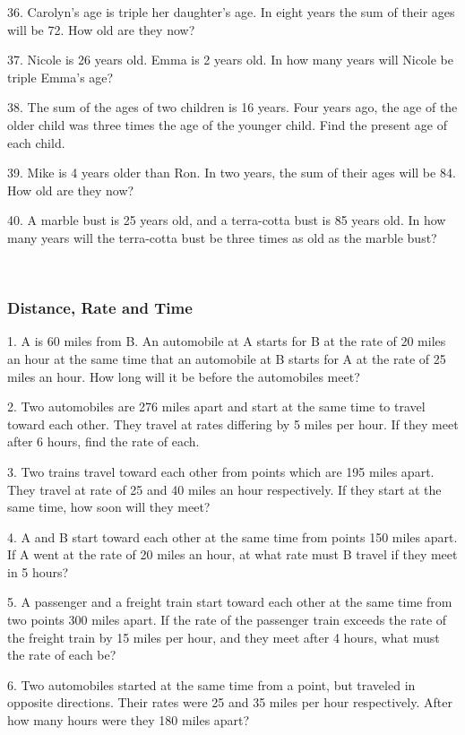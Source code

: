 36. Carolyn's age is triple her daughter's age. In eight years the sum of
their ages will be 72. How old are they now?

37. Nicole is 26 years old. Emma is 2 years old. In how many years will Nicole
be triple Emma's age?

38. The sum of the ages of two children is 16 years. Four years ago, the age
of the older child was three times the age of the younger child.
Find the present age of each child.

39. Mike is 4 years older than Ron. In two years, the sum of their ages will
be 84. How old are they now?

40. A marble bust is 25 years old, and a terra-cotta bust is 85 years old. In
how many years will the terra-cotta bust be three times as old
as the marble bust?

\vspace{4in}
~


\pagebreak

	\subsubsection{Distance, Rate and Time}\par

1. A is 60 miles from B. An automobile at A starts for B at the rate of 20
miles an hour at the same time that an automobile at B starts
for A at the rate of 25 miles an hour. How long will it be
before the automobiles meet?

2. Two automobiles are 276 miles apart and start at the same time to travel toward each other. They travel at rates differing by 5
miles per hour. If they meet after 6 hours, find the rate of
each.

3. Two trains travel toward each other from points which are 195 miles apart.
They travel at rate of 25 and 40 miles an hour respectively.
If they start at the same time, how soon will they meet?

4. A and B start toward each other at the same time from points 150 miles
apart. If A went at the rate of 20 miles an hour, at what rate must B
travel if they meet in 5 hours?

5. A passenger and a freight train start toward each other at the same time
from two points 300 miles apart. If the rate of the passenger train
exceeds the rate of the freight train by 15 miles per hour, and
they meet after 4 hours, what must the rate of each be?

6. Two automobiles started at the same time from a point, but traveled in opposite directions. Their rates were 25 and 35 miles
per hour respectively. After how many hours were they 180
miles apart?

